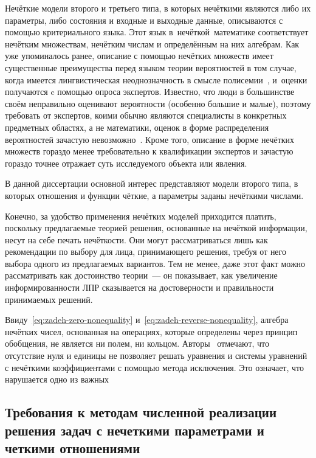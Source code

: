 Нечёткие модели второго и третьего типа, в которых нечёткими являются либо их параметры, либо состояния и входные и выходные данные, описываются с помощью критериального языка. Этот язык в~нечёткой~математике соответствует нечётким множествам, нечётким числам и определённым на них алгебрам. Как уже упоминалось ранее, описание с помощью нечётких множеств имеет существенные преимущества перед языком теории вероятностей в том случае, когда имеется лингвистическая неоднозначность в смысле полисемии~\cite{Borisov_Alexeev_Msk}, и~оценки получаются c помощью опроса экспертов. Известно, что люди в большинстве своём неправильно оценивают вероятности (особенно большие и малые), поэтому требовать от экспертов, коими обычно являются специалисты в конкретных предметных областях, а не математики, оценок в форме распределения вероятностей зачастую невозможно~\cite{Gubko}. Кроме того, описание в форме нечётких множеств гораздо менее требовательно к квалификации экспертов и зачастую гораздо точнее отражает суть исследуемого объекта или явления.

В данной диссертации основной интерес представляют модели второго типа, в которых отношения и функции чёткие, а параметры заданы нечёткими числами. 



Конечно, за удобство применения нечётких моделей приходится платить, поскольку предлагаемые теорией решения, основанные на нечёткой информации, несут на себе печать нечёткости. Они могут рассматриваться лишь как рекомендации по выбору для лица, принимающего решения, требуя от него выбора одного из предлагаемых вариантов. Тем не менее, даже этот факт можно рассматривать как достоинство теории~--- он показывает, как увеличение информированности ЛПР сказывается на достоверности и правильности принимаемых решений.

Ввиду~\eqref{eq:zadeh-zero-nonequality} и~\eqref{eq:zadeh-reverse-nonequality}, алгебра нечётких чисел, основанная на операциях, которые определены через принцип обобщения, не является ни полем, ни кольцом. Авторы~\cite{Rutkovskaya} отмечают, что отсутствие нуля и единицы не позволяет решать уравнения и системы уравнений с нечёткими коэффициентами с помощью метода исключения. Это означает, что нарушается одно из важных


\subsection{Требования к методам численной реализации решения задач с нечеткими параметрами и четкими отношениями}

